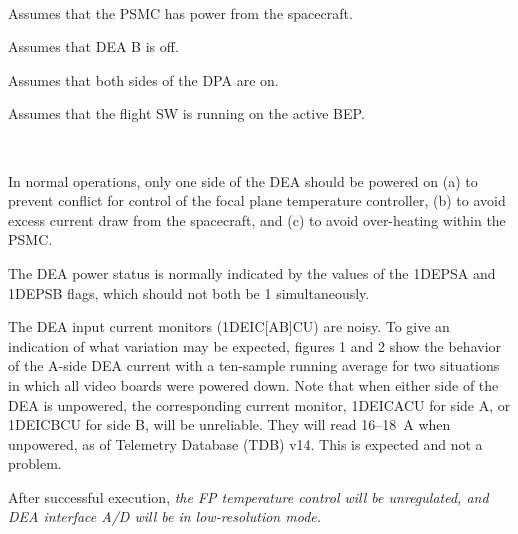 \documentclass[11pt]{article}
\begin{document}
\vspace{0.15in}
\normalsize
{} \\
\normalsize
\be
\item Assumes that the PSMC has power from the spacecraft.
\vspace{-0.10in}
\item Assumes that DEA B is off.
\vspace{-0.10in}
\item Assumes that both sides of the DPA are on.
\vspace{-0.10in}
\item Assumes that the flight SW is running on the active BEP.
\ee
\vspace{0.1in}
\normalsize
{} \\
\normalsize

\normalsize
{} \\
\normalsize

In normal operations, only one side of the DEA should be powered on
(a) to prevent conflict for control of the focal plane temperature controller,
(b) to avoid excess current draw from the spacecraft, and (c) to avoid over-heating
within the PSMC.

The DEA power status is normally indicated by the values of the 1DEPSA and
1DEPSB flags, which should not both be 1 simultaneously.

The DEA input current monitors (1DEIC[AB]CU) are noisy.
To give an indication of what variation may be expected, figures 1 and 2
show the behavior of the A-side DEA current with a ten-sample running
average for two situations in which all video boards were powered down. Note that
when either side of the DEA is unpowered, the corresponding current monitor, 
1DEICACU for side A, or 1DEICBCU for side B, will be unreliable. They will read
16--18~A when unpowered, as of Telemetry Database (TDB) v14. This is expected and
not a problem.

After successful execution, {\em the FP temperature control will be unregulated,
and DEA interface A/D will be in low-resolution mode.}\\
\end{document}
